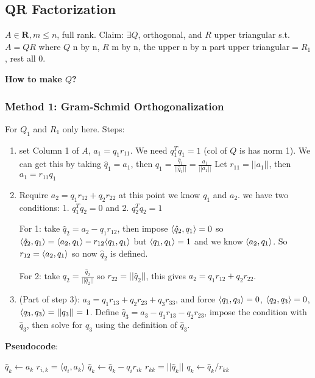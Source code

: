 \subsection{QR Factorization}
\label{sec:QR2}

$A\in \mathbf{R}, m\le n$, full rank. Claim: $\exists Q$, orthogonal,
and $R$ upper triangular s.t. $A=QR$ where $Q$ n by n, $R$ m by n, the
upper n by n part upper triangular$=R_1$, rest all 0.

\textbf{How to make $Q$?}

\subsubsection{Method 1: Gram-Schmid Orthogonalization}
For $Q_1$ and $R_1$ only here.
Steps:
\begin{enumerate}
\item set Column 1 of $A$, $a_1 = q_1r_{11}$. We need $q_1^Tq_1= 1$
  (col of $Q$ is has norm 1). We can get this by taking $\hat q_1 =
  a_1$, then $q_1=\frac{\hat q_1}{||\hat q_1 ||} = \frac{a_1}{||a_1||}
  $
Let $r_{11} = ||a_1||$, then $a_1 =r_{11}q_1$
\item Require $a_2 = q_{1}r_{12} + q_2r_{22}$ at this point we know
  $q_1$ and $a_2$. we have two conditions: 1. $q_1^Tq_2= 0$ and
  2. $q_2^Tq_2 = 1$


For 1: take $\hat q_2 = a_2 - q_1r_{12}$, then impose $\langle \hat q_2,
q_1\rangle = 0$ so $\langle \hat q_2,
q_1\rangle = \langle a_2, q_1\rangle  - r_{12}\langle q_1, q_1\rangle $ but $\langle q_1, q_1\rangle =1$ and we know
$\langle a_2, q_1\rangle $. So $r_{12} = \langle a_2, q_1\rangle $ so now $\hat q_2$ is defined. 

For 2: take $q_2 = \frac{\hat q_2}{||\hat q_2||}$ so $r_{22} = ||\hat
q_2||$, this gives $a_2 = q_{1}r_{12} + q_2r_{22}$.
\item (Part of step 3): $a_3 = q_1r_{13} + q_2r_{23} + q_3r_{33}$, and
  force $\langle q_1, q_3\rangle  =0$, $\langle q_2, q_3\rangle =0$, $\langle q_3, q_3\rangle  = ||q_3|| = 1$.
Define $\hat q_3 = a_3 - q_1r_{13} - q_2r_{23}$, impose the condition
with $\hat q_3$, then solve for $q_3$ using the definition of $\hat q_3$.
\end{enumerate}

\textbf{Pseudocode}:
\begin{algorithmic}
  \STATE $\hat q_k \gets a_k$
     \STATE $r_{i,k} = \langle q_i, a_k \rangle$
     \STATE $\hat q_k \gets \hat q_k - q_i r_{ik}$
  \ENDFOR
  \STATE $r_{kk} = ||\hat q_k||$
  \STATE $q_k \gets \hat q_k/r_{kk}$
\ENDFOR
\end{algorithmic}

